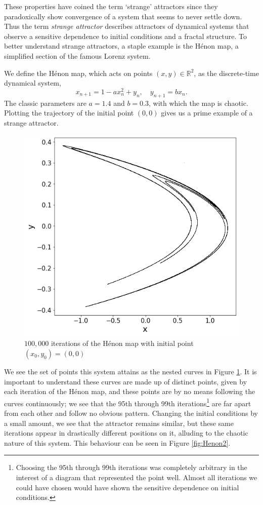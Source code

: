 These properties have coined the term `strange' attractors\cite{feldman2012chaos} since they paradoxically show convergence of a system that seems to never settle down. Thus the term \emph{strange attractor} describes attractors of dynamical systems that observe a sensitive dependence to initial conditions and a fractal structure. To better understand strange attractors, a staple example is the Hénon map\cite{nonlinear_system}, a simplified section of the famous Lorenz system.
\begin{exmp}
    We define the Hénon map, which acts on points $(x,y)\in \mathbb{R}^2$, as the discrete-time dynamical system, 
    \[
x_{n+1} = 1 - a x_n^2 + y_n, \quad y_{n+1} = b x_n.
    \]
    The classic parameters are $a=1.4$ and $b=0.3$, with which the map is chaotic. Plotting the trajectory of the initial point $(0,0)$ gives us a prime example of a strange attractor.
    \begin{figure}
        \centering
        \includegraphics[width=0.4\linewidth]{Images/Henon attractor.png}
        \caption{$100,000$ iterations of the Hénon map with initial point $(x_0, y_0)=(0,0)$}
        \label{fig:Henon1}
    \end{figure}
    We see the set of points this system attains as the nested curves in Figure \ref{fig:Henon1}. It is important to understand these curves are made up of distinct points, given by each iteration of the Hénon map, and these points are by no means following the curves continuously; we see that the 95th through 99th iterations\footnote{Choosing the 95th through 99th iterations was completely arbitrary in the interest of a diagram that represented the point well. Almost all iterations we could have chosen would have shown the sensitive dependence on initial conditions.} are far apart from each other and follow no obvious pattern. Changing the initial conditions by a small amount, we see that the attractor remains similar, but these same iterations appear in drastically different positions on it, alluding to the chaotic nature of this system. This behaviour can be seen in Figure \ref{fig:Henon2}.

\end{exmp}
